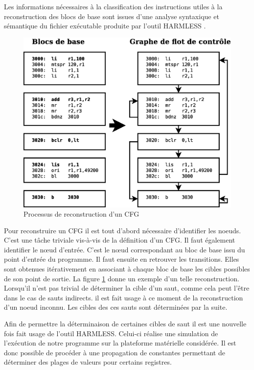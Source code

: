   Les informations nécessaires à la classification des instructions utiles à la
  reconstruction des blocs de base sont issues d'une analyse syntaxique et
  sémantique du fichier exécutable produite par l'outil \textsc{HARMLESS}
  \cite{KBB12}.
  

  \begin{figure}[ht]
    \centering
    \includegraphics[scale=0.3]{img/recons2.eps}
    \caption{Processus de reconstruction d'un CFG}
    \label{fig:recons2}
  \end{figure}
    
  Pour reconstruire un CFG il est tout d'abord nécessaire d'identifier les
  noeuds. C'est une tâche triviale vis-à-vis de la définition d'un CFG. Il faut
  également identifier le n{\oe}ud d'entrée. C'est le n{\oe}ud correspondant au
  bloc de base issu du point d'entrée du programme. Il faut ensuite en retrouver
  les transitions. Elles sont obtenues itérativement en associant à chaque bloc
  de base les cibles possibles de son point de sortie. La figure
  \ref{fig:recons2} donne un exemple d'un telle reconstruction. Lorsqu'il n'est
  pas trivial de déterminer la cible d'un saut, comme cela peut l'être dans le
  cas de sauts indirects. il est fait usage à ce moment de la reconstruction
  d'un noeud inconnu. Les cibles des ces sauts sont déterminées par la suite.


  Afin de permettre la déterminaison de certaines cibles de saut il est une
  nouvelle fois fait usage de l'outil \textsc{HARMLESS}. Celui-ci réalise une
  simulation de l'exécution de notre programme sur la plateforme matérielle
  considérée. Il est donc possible de procéder à une propagation de constantes
  permettant de déterminer des plages de valeurs pour certains registres.
